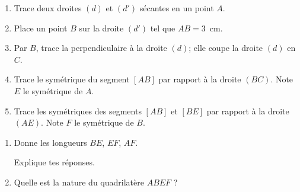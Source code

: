 \begin{myenumerate}
\item
\begin{enumerate}
\item Trace deux droites $(d)$ et $(d')$ sécantes en un point $A$.
\item Place un point $B$ sur la droite $(d')$ tel que $AB=3$~cm.
\item Par $B$, trace la perpendiculaire à la droite $(d)$; elle coupe
  la droite $(d)$ en $C$.
\item Trace le symétrique du segment $[AB]$ par rapport à la droite
  $(BC)$. Note $E$ le symétrique de $A$.
\item Trace les symétriques des segments $[AB]$ et $[BE]$ par rapport
  à la droite $(AE)$. Note $F$ le symétrique de $B$.
\end{enumerate}
\item
\begin{enumerate}
\item Donne les longueurs $BE$, $EF$, $AF$.
\par Explique tes réponses.
\item Quelle est la nature du quadrilatère $ABEF$ ?
\end{enumerate}
\end{myenumerate}
